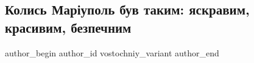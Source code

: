  
 
 
 
 

\subsection{Колись Маріуполь був таким: яскравим, красивим, безпечним}
\label{sec:21_02_2023.fb.vostochniy_variant.1.kolis_mar_upol_buv_t}

\ifcmt
 author_begin
   author_id vostochniy_variant
 author_end
\fi
